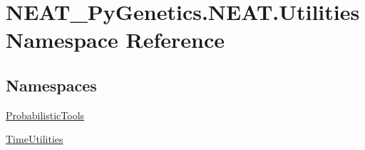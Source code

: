 \hypertarget{namespaceNEAT__PyGenetics_1_1NEAT_1_1Utilities}{}\section{N\+E\+A\+T\+\_\+\+Py\+Genetics.\+N\+E\+A\+T.\+Utilities Namespace Reference}
\label{namespaceNEAT__PyGenetics_1_1NEAT_1_1Utilities}
\subsection*{Namespaces}
\begin{DoxyCompactItemize}
\item 
 \hyperlink{namespaceNEAT__PyGenetics_1_1NEAT_1_1Utilities_1_1ProbabilisticTools}{Probabilistic\+Tools}
\item 
 \hyperlink{namespaceNEAT__PyGenetics_1_1NEAT_1_1Utilities_1_1TimeUtilities}{Time\+Utilities}
\end{DoxyCompactItemize}
